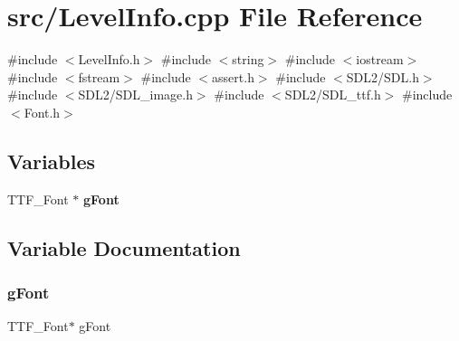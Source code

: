 \section{src/\+Level\+Info.cpp File Reference}
\label{_level_info_8cpp}
{\ttfamily \#include $<$Level\+Info.\+h$>$}\newline
{\ttfamily \#include $<$string$>$}\newline
{\ttfamily \#include $<$iostream$>$}\newline
{\ttfamily \#include $<$fstream$>$}\newline
{\ttfamily \#include $<$assert.\+h$>$}\newline
{\ttfamily \#include $<$S\+D\+L2/\+S\+D\+L.\+h$>$}\newline
{\ttfamily \#include $<$S\+D\+L2/\+S\+D\+L\+\_\+image.\+h$>$}\newline
{\ttfamily \#include $<$S\+D\+L2/\+S\+D\+L\+\_\+ttf.\+h$>$}\newline
{\ttfamily \#include $<$Font.\+h$>$}\newline
\subsection*{Variables}
\begin{DoxyCompactItemize}
\item 
T\+T\+F\+\_\+\+Font $\ast$ \textbf{ g\+Font}
\end{DoxyCompactItemize}


\subsection{Variable Documentation}
\mbox{\label{_level_info_8cpp_a88e76957ec56f067af762125afcac25f}} 
\subsubsection{g\+Font}
{\footnotesize\ttfamily T\+T\+F\+\_\+\+Font$\ast$ g\+Font}

